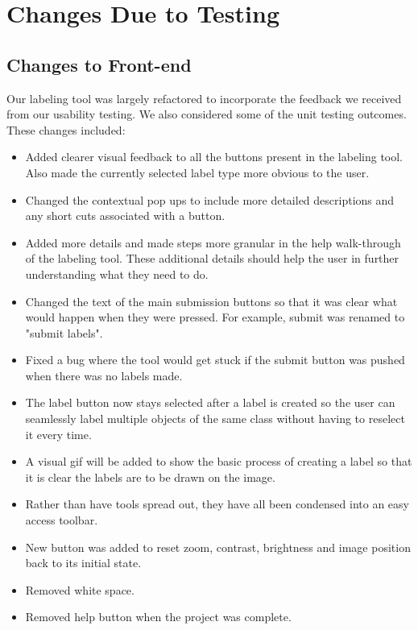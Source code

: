\documentclass[12pt, titlepage]{article}
\begin{document}
\section{Changes Due to Testing}


\subsection{Changes to Front-end}
Our labeling tool was largely refactored to incorporate the feedback we received from our usability testing. We also considered some of the unit testing outcomes. These changes included:
\begin{itemize}
    \item Added clearer visual feedback to all the buttons present in the labeling tool. Also made the currently selected label type more obvious to the user.
    \item Changed the contextual pop ups to include more detailed descriptions and any short cuts associated with a button.
    \item Added more details and made steps more granular in the help walk-through of the labeling tool. These additional details should help the user in further understanding what they need to do.
    \item Changed the text of the main submission buttons so that it was clear what would happen when they were pressed. For example, submit was renamed to "submit labels".
    \item Fixed a bug where the tool would get stuck if the submit button was pushed when there was no labels made.
    \item The label button now stays selected after a label is created so the user can seamlessly label multiple objects of the same class without having to reselect it every time.
    \item A visual gif will be added to show the basic process of creating a label so that it is clear the labels are to be drawn on the image.
    \item Rather than have tools spread out, they have all been condensed into an easy access toolbar.
    \item New button was added to reset zoom, contrast, brightness and image position back to its initial state.
    \item Removed white space.
    \item Removed help button when the project was complete.
\end{itemize}
\end{document}
